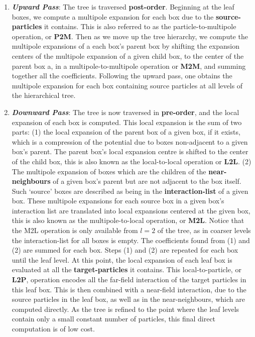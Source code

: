 \begin{enumerate}
    \item \textbf{\textit{Upward Pass}}: The tree is traversed \textbf{\gls{post-order}}.
    Beginning at the leaf boxes, we compute a multipole expansion for each box
    due to the \textbf{\gls{source-particles}} it contains. This is also referred to as the particle-to-multipole
    operation, or \textbf{\gls{P2M}}. Then as we move up the tree hierarchy, we
    compute the multipole expansions of a each box's parent box by shifting the
    expansion centers of the multipole expansion of a given child box, to the center
    of the parent box a, in a multipole-to-multipole operation or \textbf{\gls{M2M}},
    and summing together all the coefficients. Following the upward pass, one
    obtains the multipole expansion for each box containing source particles at
    all levels of the hierarchical tree.
    \item \textbf{\textit{Downward Pass}}: The tree is now traversed in
    \textbf{\gls{pre-order}}, and the local expansion of each box is computed.
    This local expansion is the sum of two parts: (1) the local expansion of the
    parent box of a given box, if it exists, which is a compression of the potential due to boxes
    non-adjacent to a given box's parent. The parent box's local expansion centre
    is shifted to the center of the child box, this is also known as the local-to-local
    operation or \textbf{\gls{L2L}}. (2) The multipole expansion of boxes which
    are the children of the \textbf{\gls{near-neighbours}} of a given box's
    parent but are not adjacent to the box itself. Such `source' boxes are described
    as being in the \textbf{\gls{interaction-list}} of a given box. These multipole
    expansions for each source box in a given box's interaction list are translated into local expansions centered at
    the given box, this is also known as
    the multipole-to-local operation, or \textbf{\gls{M2L}}. Notice that the
    \gls{M2L} operation is only available from $l=2$ of the tree, as in coarser
    levels the \gls{interaction-list} for all boxes is empty. The coefficients found
    from (1) and (2) are summed for each box. Steps (1) and (2) are repeated for each
    box until the leaf level. At this point, the local expansion
    of each leaf box is evaluated at all the \textbf{\gls{target-particles}} it contains.
    This local-to-particle, or \textbf{\gls{L2P}}, operation encodes all the \gls{far-field}
    interaction of the target particles in this leaf box. This is then combined with
    a \gls{near-field} interaction, due to the source particles in the leaf box,
    as well as in the \gls{near-neighbours}, which are computed directly. As the
    tree is refined to the point where the leaf levels contain only a small constant
    number of particles, this final direct computation is of low cost.
\end{enumerate}


